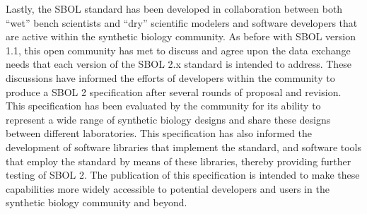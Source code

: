Lastly, the SBOL standard has been developed in collaboration between both ``wet'' bench scientists and ``dry'' scientific modelers and software developers that are active within the synthetic biology community. 
As before with SBOL version 1.1, this open community has met to discuss and agree upon the data exchange needs that each version of the SBOL 2.x standard is intended to address. 
These discussions have informed the efforts of  developers within the community to produce a SBOL 2 specification after several rounds of proposal and revision. This specification has been evaluated by the community for its ability to represent a wide range of synthetic biology designs and share these designs between different laboratories. 
This specification has also informed the development of software libraries that implement the standard, and software tools that employ the standard by means of these libraries, thereby providing further testing of SBOL 2. 
The publication of this specification is intended to make these capabilities more widely accessible to potential developers and users in the synthetic biology community and beyond.
